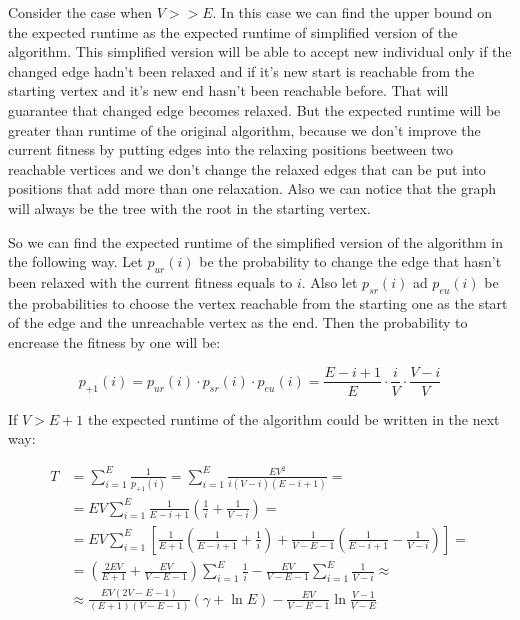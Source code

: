 \documentclass[a4paper]{article}
\begin{document}
 
 Consider the case when $V >> E$. In this case we can find the upper bound on the expected runtime as the expected runtime of simplified version of the algorithm. This simplified version will be able to accept new individual only if the changed edge hadn't been relaxed and if it's new start is reachable from the starting vertex and it's new end hasn't been reachable before. That will guarantee that changed edge becomes relaxed. But the expected runtime will be greater than runtime of the original algorithm, because we don't improve the current fitness by putting edges into the relaxing positions beetween two reachable vertices and we don't change the relaxed edges that can be put into positions that add more than one relaxation. Also we can notice that the graph will always be the tree with the root in the starting vertex.
 
 So we can find the expected runtime of the simplified version of the algorithm in the following way. Let $p_{ur}(i)$ be the probability to change the edge that hasn't been relaxed with the current fitness equals to $i$. Also let $p_{sr}(i)$ ad $p_{eu}(i)$ be the probabilities to choose the vertex reachable from the starting one as the start of the edge and the unreachable vertex as the end.
 Then the probability to encrease the fitness by one will be:
 
 $$ p_{+1}(i) = p_{ur}(i) \cdot p_{sr}(i) \cdot p_{eu}(i) = \frac{E - i + 1}{E} \cdot \frac{i}{V} \cdot \frac{V - i}{V}$$
 
 If $V > E + 1$ the expected runtime of the algorithm could be written in the next way:
 
 \begin{align*}
  T & = \sum_{i = 1}^E \frac{1}{p_{+1}(i)} = \sum_{i = 1}^E \frac{EV^2}{i(V - i)(E - i + 1)} = \\
    & = EV \sum_{i = 1}^E \frac{1}{E - i + 1} \left(\frac{1}{i} + \frac{1}{V - i} \right) = \\
    & = EV \sum_{i = 1}^E \left[ \frac{1}{E + 1} \left( \frac{1}{E - i + 1} + \frac{1}{i}\right) + \frac{1}{V - E - 1} \left( \frac{1}{E - i + 1} - \frac{1}{V - i} \right)\right] = \\
    & = \left( \frac{2EV}{E + 1} + \frac{EV}{V - E - 1}\right) \sum_{i = 1}^E \frac{1}{i} - \frac{EV}{V - E - 1} \sum_{i = 1}^E \frac{1}{V - i} \approx \\
    & \approx \frac{EV(2V - E - 1)}{(E + 1)(V - E - 1)}(\gamma + \ln{E}) - \frac{EV}{V - E - 1} \ln \frac{V - 1}{V - E}
 \end{align*}
 
\end{document}
